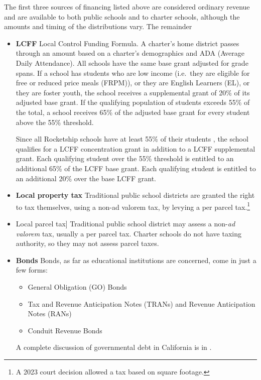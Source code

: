 The first three sources of financing listed above are considered ordinary revenue and are available to both public schools and to charter schools, although the amounts and timing of the distributions vary. The remainder 

\begin{itemize}
  \item \textbf{LCFF} Local Control Funding Formula. A charter's home district passes through an amount based on a charter's demographics and ADA (Average Daily Attendance). All schools have the same base grant adjusted for grade spans.  If a school has students who are low income (i.e.~they are eligible for free or reduced price meals (FRPM)), or they are English Learners (EL), or they are foster youth, the school receives a supplemental grant of 20\% of its adjusted base grant. If the qualifying population of students exceeds 55\% of the total, a school receives 65\% of the adjusted base grant for every student above the 55\% threshold.

Since all Rocketship schools have at least 55\% of their students , the school qualifies for a LCFF concentration grant in addition to a LCFF supplemental grant. Each qualifying student over the 55\% threshold is entitled to an additional 65\% of the LCFF base grant. Each qualifying student is entitled to an additional 20\% over the base LCFF grant.\\
    \item \textbf{Local property tax} Traditional public school districts are granted the right to tax themselves, using a non-ad valorem tax, by levying a per parcel tax.\footnote{A 2023 court decision allowed a tax based on square footage.}
  \item Local parcel tax] Traditional public school district may assess a non-\textit{ad valorem} tax, usually a per parcel tax. Charter schools do not have taxing authority, so they may not assess parcel taxes.
  \item \textbf{Bonds} Bonds, as far as educational institutions are concerned, come in just a few forms:
        \begin{itemize}
          \item General Obligation (GO) Bonds
          \item Tax and Revenue Anticipation Notes (TRANs) and Revenue Anticipation Notes (RANs)
          \item Conduit Revenue Bonds
                  \end{itemize}
  A complete discussion of governmental debt in California is in \textcite{CDIAC2023}.
  

\end{itemize}
